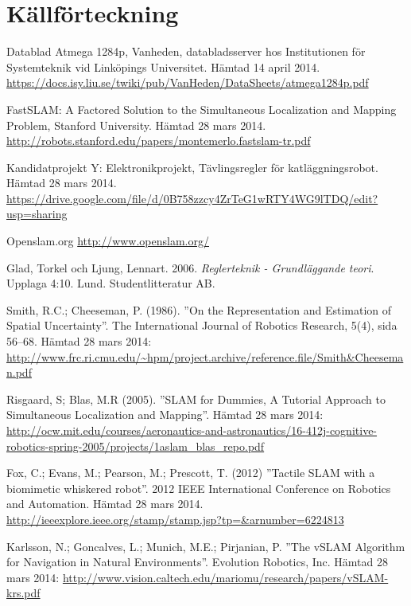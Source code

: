 \documentclass[a4paper,12pt,fleqn]{article}
\begin{document}
\newpage 
\section{Källförteckning} 
Datablad Atmega 1284p, Vanheden, databladsserver hos Institutionen för Systemteknik vid Linköpings Universitet. Hämtad 14 april 2014. \url{https://docs.isy.liu.se/twiki/pub/VanHeden/DataSheets/atmega1284p.pdf}

FastSLAM: A Factored Solution to the Simultaneous
Localization and Mapping Problem, Stanford University. Hämtad 28 mars 2014.
\url{http://robots.stanford.edu/papers/montemerlo.fastslam-tr.pdf}

Kandidatprojekt Y: Elektronikprojekt, Tävlingsregler för katläggningsrobot. Hämtad 28 mars 2014.  \url{https://drive.google.com/file/d/0B758zzcy4ZrTeG1wRTY4WG9lTDQ/edit?usp=sharing}

Openslam.org
\url{http://www.openslam.org/}

Glad, Torkel och Ljung, Lennart. 2006. \textit{Reglerteknik - Grundläggande teori}. Upplaga 4:10. Lund. Studentlitteratur AB.

Smith, R.C.; Cheeseman, P. (1986). ''On the Representation and Estimation of Spatial Uncertainty''. The
International Journal of Robotics Research, 5(4), sida 56–68. Hämtad
28 mars 2014:
\url{http://www.frc.ri.cmu.edu/~hpm/project.archive/reference.file/Smith&Cheeseman.pdf}

Risgaard, S; Blas, M.R (2005).
''SLAM for Dummies, A Tutorial Approach to Simultaneous Localization and Mapping''. 
Hämtad 28 mars 2014:
\url{http://ocw.mit.edu/courses/aeronautics-and-astronautics/16-412j-cognitive-robotics-spring-2005/projects/1aslam_blas_repo.pdf}

Fox, C.; Evans, M.; Pearson, M.; Prescott, T. (2012)
''Tactile SLAM with a biomimetic whiskered robot''. 2012 IEEE International Conference on Robotics and Automation. Hämtad 28 mars 2014.
\url{http://ieeexplore.ieee.org/stamp/stamp.jsp?tp=&arnumber=6224813}

Karlsson, N.; Goncalves, L.; Munich, M.E.; Pirjanian, P.
''The vSLAM Algorithm for Navigation in Natural Environments''. Evolution Robotics, Inc. Hämtad 28 mars 2014:
\url{http://www.vision.caltech.edu/mariomu/research/papers/vSLAM-krs.pdf}
\end{document}

